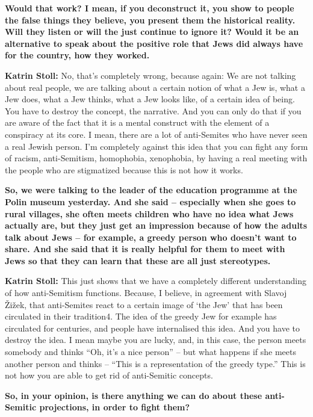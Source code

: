 \textbf{Would that work? I mean, if you deconstruct it, you show to people the false things they believe, you present them the historical reality. Will they listen or will the just continue to ignore it? Would it be an alternative to speak about the positive role that Jews did always have for the country, how they worked.} 

\textbf{Katrin Stoll:} No, that’s completely wrong, because again:  We are not talking about real people, we are talking about a certain notion of what a Jew is, what a Jew does, what a Jew thinks, what a Jew looks like, of a certain idea of being.  You have to destroy the concept, the narrative. And you can only do that if you are aware of the fact that it is a mental construct with the element of a conspiracy at its core. I mean, there are a lot of anti-Semites who have never seen a real Jewish person. I’m completely against this idea that you can fight any form of racism, anti-Semitism, homophobia, xenophobia, by having a real meeting with the people who are stigmatized because this is not how it works. 

\textbf{So, we were talking to the leader of the education programme at the Polin museum yesterday. And she said – especially when she goes to rural villages, she often meets children who have no idea what Jews actually are, but they just get an impression because of how the adults talk about Jews – for example, a greedy person who doesn’t want to share. And she said that it is really helpful for them to meet with Jews so that they can learn that these are all just stereotypes.} 

\textbf{Katrin Stoll:} This just shows that we have a completely different understanding of how anti-Semitism functions. Because, I believe, in agreement with Slavoj Žižek, that anti-Semites react to a certain image of ‘the Jew’ that has been circulated in their tradition4. The idea of the greedy Jew for example has circulated for centuries, and people have internalised this idea. And you have to destroy the idea. I mean maybe you are lucky, and, in this case, the person meets somebody and thinks “Oh, it’s a nice person” – but what happens if she meets another person and thinks – “This is a representation of the greedy type.” This is not how you are able to get rid of anti-Semitic concepts. 

\textbf{So, in your opinion, is there anything we can do about these anti-Semitic projections, in order to fight them?} 

